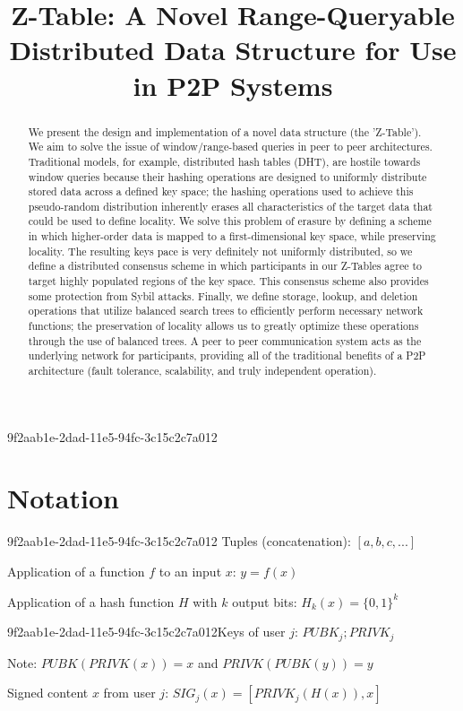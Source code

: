 \documentclass[12pt]{article}
\title{Z-Table: A Novel Range-Queryable Distributed Data Structure for Use in P2P Systems}
\begin{document}
\maketitle
9f2aab1e-2dad-11e5-94fc-3c15c2c7a012
\begin{abstract}
We present the design and implementation of a novel data structure (the 'Z-Table'). We aim to solve the issue of window/range-based queries in peer to peer architectures. Traditional models, for example,  distributed hash tables (DHT), are hostile towards window queries because their hashing operations are designed to uniformly distribute stored data across a defined key space; the hashing operations used to achieve this pseudo-random distribution inherently erases all characteristics of the target data that could be used to define locality. We solve this problem of erasure by defining a scheme in which higher-order data is mapped to a first-dimensional key space, while preserving locality. The resulting keys pace is very definitely not uniformly distributed, so we define a distributed consensus scheme in which participants in our Z-Tables agree to target highly populated regions of the key space. This consensus scheme also provides some protection from Sybil attacks. Finally, we define storage, lookup, and deletion operations that utilize balanced search trees to efficiently perform necessary network functions; the preservation of locality allows us to greatly optimize these operations through the use of balanced trees. A peer to peer communication system acts as the underlying network for participants, providing all of the traditional benefits of a P2P architecture (fault tolerance, scalability, and truly independent operation).
\end{abstract}

\section{Notation}
9f2aab1e-2dad-11e5-94fc-3c15c2c7a012
Tuples (concatenation): $[a,b,c,...]$

Application of a function $f$ to an input $x$: $y=f(x)$

Application of a hash function $H$ with $k$ output bits: $H_{k}(x) = \{0,1\}^k$

9f2aab1e-2dad-11e5-94fc-3c15c2c7a012Keys of user $j$: $ PUBK_j; PRIVK_j $

Note: $PUBK(PRIVK(x)) = x$ and $PRIVK(PUBK(y)) = y$~

Signed content $x$ from user $j$: $SIG_j(x) = \left[ PRIVK_j( H(x) ), x \right]$
\end{document}
